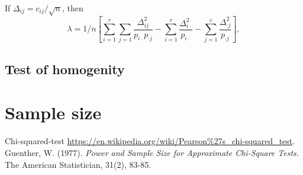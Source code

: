 \documentclass{article}
\begin{document}
If $\Delta_{ij} = c_{ij}/\sqrt{n}$, then 
\begin{equation}
    \lambda = 1/n \left[\sum_{i=1}^{r}\sum_{j=1} \frac{\Delta_{ij}^2}{p_{i\cdot}p_{\cdot j}} - \sum_{i=1}^{r}\frac{\Delta_{i \cdot}^2}{p_{i \cdot}} - \sum_{j=1}^{c}\frac{\Delta_{\cdot j}^2}{p_{\cdot j}}\right],
\end{equation}


\subsection{Test of homogenity}

\section{Sample size}


\begin{thebibliography}{9}
    Chi-squared-test 
    \url{https://en.wikipedia.org/wiki/Pearson\%27s\_chi-squared\_test}.
    Guenther, W. (1977). 
    \textit{Power and Sample Size for Approximate Chi-Square Tests.} 
    The American Statistician, 31(2), 83-85.

\end{thebibliography}   
\end{document}
